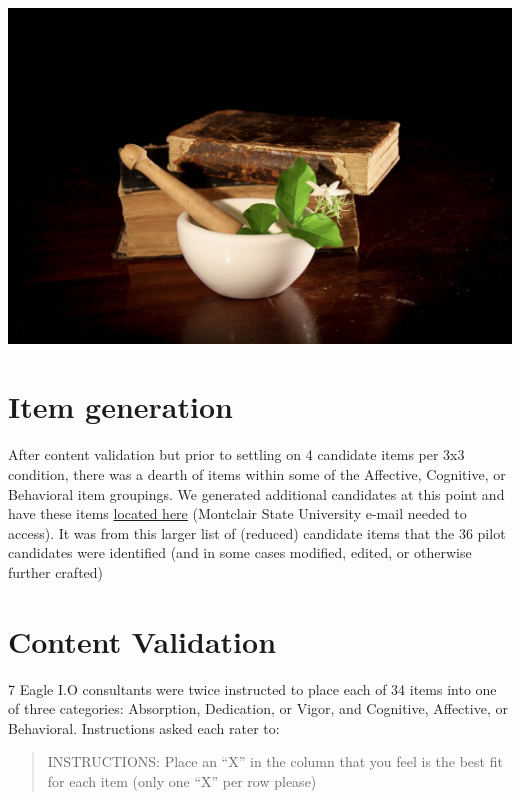 \documentclass[
]{book}
\begin{document}
\includegraphics{develop.jpg}

\hypertarget{item-generation}{%
\section{Item generation}\label{item-generation}}

After content validation but prior to settling on 4 candidate items per 3x3 condition, there was a dearth of items within some of the Affective, Cognitive, or Behavioral item groupings. We generated additional candidates at this point and have these items \href{https://docs.google.com/document/d/1whB4Ve4aDDl3bxx3dIlloouTDy1ScCcxrT3gK6s9DyU/edit?usp=sharing}{located here} (Montclair State University e-mail needed to access). It was from this larger list of (reduced) candidate items that the 36 pilot candidates were identified (and in some cases modified, edited, or otherwise further crafted)

\hypertarget{content-validation}{%
\section{Content Validation}\label{content-validation}}

7 Eagle I.O consultants were twice instructed to place each of 34 items into one of three categories: Absorption, Dedication, or Vigor, and Cognitive, Affective, or Behavioral. Instructions asked each rater to:

\begin{quote}
INSTRUCTIONS: Place an ``X'' in the column that you feel is the best fit for each item (only one ``X'' per row please)
\end{quote}
\end{document}

